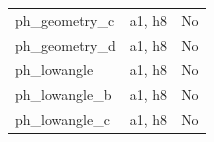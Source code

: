\begin{longtable}{>{\raggedright\arraybackslash}p{.47\linewidth}>{\raggedright\arraybackslash}p{.25\linewidth}l}
ph\_\allowbreak{}geometry\_\allowbreak{}c & %
a1, h8 & %
No \\ %

ph\_\allowbreak{}geometry\_\allowbreak{}d & %
a1, h8 & %
No \\ %

ph\_\allowbreak{}lowangle & %
a1, h8 & %
No \\ %

ph\_\allowbreak{}lowangle\_\allowbreak{}b & %
a1, h8 & %
No \\ %

ph\_\allowbreak{}lowangle\_\allowbreak{}c & %
a1, h8 & %
No \\ %


\end{longtable}
